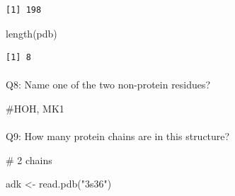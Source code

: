 \documentclass[
  letterpaper,
  DIV=11,
  numbers=noendperiod]{scrartcl}
\makeatletter
\let\oldparagraph\paragraph
\renewcommand{\paragraph}{
    \@ifstar
      \xxxParagraphStar
      \xxxParagraphNoStar
  }
\newcommand{\xxxParagraphStar}[1]{\oldparagraph*{#1}\mbox{}}
\newcommand{\xxxParagraphNoStar}[1]{\oldparagraph{#1}\mbox{}}
\newenvironment{Shaded}{\begin{snugshade}}{\end{snugshade}}
\newcommand{\CommentTok}[1]{\textcolor[rgb]{0.37,0.37,0.37}{#1}}
\newcommand{\FunctionTok}[1]{\textcolor[rgb]{0.28,0.35,0.67}{#1}}
\newcommand{\NormalTok}[1]{\textcolor[rgb]{0.00,0.23,0.31}{#1}}
\newcommand{\OtherTok}[1]{\textcolor[rgb]{0.00,0.23,0.31}{#1}}
\newcommand{\SpecialCharTok}[1]{\textcolor[rgb]{0.37,0.37,0.37}{#1}}
\newcommand{\StringTok}[1]{\textcolor[rgb]{0.13,0.47,0.30}{#1}}
\makeatother
\begin{document}
\begin{Shaded}
\end{Shaded}

\begin{verbatim}
[1] 198
\end{verbatim}

\begin{Shaded}
\begin{Highlighting}[]
\FunctionTok{length}\NormalTok{(pdb)}
\end{Highlighting}
\end{Shaded}

\begin{verbatim}
[1] 8
\end{verbatim}

\paragraph{Q8: Name one of the two non-protein
residues?}\label{q8-name-one-of-the-two-non-protein-residues}

\begin{Shaded}
\begin{Highlighting}[]
\CommentTok{\#HOH, MK1}
\end{Highlighting}
\end{Shaded}

\paragraph{Q9: How many protein chains are in this
structure?}\label{q9-how-many-protein-chains-are-in-this-structure}

\begin{Shaded}
\begin{Highlighting}[]
\CommentTok{\# 2 chains}
\end{Highlighting}
\end{Shaded}

\begin{Shaded}
\begin{Highlighting}[]
\NormalTok{adk }\OtherTok{\textless{}{-}} \FunctionTok{read.pdb}\NormalTok{(}\StringTok{"3s36"}\NormalTok{)}
\end{Highlighting}
\end{Shaded}
\end{document}
